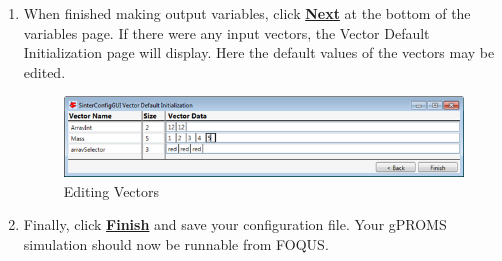 \begin{enumerate}
\item	When finished making output variables, click \textbf{\underline{Next}} at the bottom of the variables page.
If there were any input vectors, the Vector Default Initialization page will display.  Here the default values of the vectors may be edited.

\begin{figure}[H]
	\begin{center}
		\includegraphics[scale=0.55]{Chapt_sinter/figs/gPROMS/25_Vectorss}
		\caption{Editing Vectors}
		\label{fig.sinter.gproms.vectors}
	\end{center}
\end{figure}

\item Finally, click \textbf{\underline{Finish}} and save your
  configuration file.  Your gPROMS simulation should now be runnable
  from FOQUS.

\end{enumerate}
